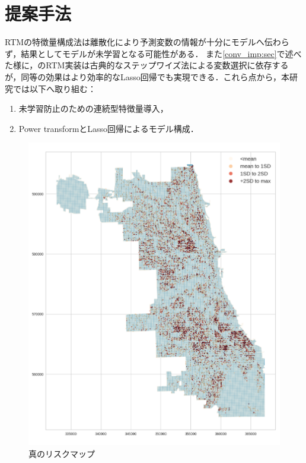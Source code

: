 \section{提案手法}
\label{chapter_3}
RTMの特徴量構成法は離散化により予測変数の情報が十分にモデルへ伝わらず，結果としてモデルが未学習となる可能性がある．
また\cref{conv_imp:sec}で述べた様に，\cite{caplan2015risk}のRTM実装は古典的なステップワイズ法\cite{islp}による変数選択に依存するが，同等の効果はより効率的なLasso回帰\cite{Lasso}でも実現できる．これら点から，本研究では以下へ取り組む：
\begin{enumerate}
  \item 未学習防止のための連続型特徴量導入，
  \item Power transformとLasso回帰によるモデル構成．
\end{enumerate}

\begin{figure}
  \centering 
  \includegraphics[scale=0.25]{./figures/actual_riskmap.png}
  \caption{真のリスクマップ}
  \label{fig:non-crime-timeseries-actual-risk}
\end{figure}


